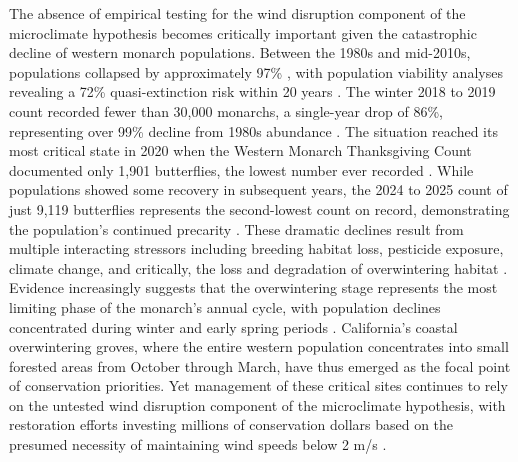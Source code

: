 The absence of empirical testing for the wind disruption component of the microclimate hypothesis becomes critically important given the catastrophic decline of western monarch populations. Between the 1980s and mid-2010s, populations collapsed by approximately 97\% \parencite{schultzCitizenScienceMonitoring2017}, with population viability analyses revealing a 72\% quasi-extinction risk within 20 years \parencite{schultzCitizenScienceMonitoring2017}. The winter 2018 to 2019 count recorded fewer than 30,000 monarchs, a single-year drop of 86\%, representing over 99\% decline from 1980s abundance \parencite{peltonWesternMonarchPopulation2019}. The situation reached its most critical state in 2020 when the Western Monarch Thanksgiving Count documented only 1,901 butterflies, the lowest number ever recorded \parencite{xercessocietyWesternMonarchThanksgiving2025}. While populations showed some recovery in subsequent years, the 2024 to 2025 count of just 9,119 butterflies represents the second-lowest count on record, demonstrating the population's continued precarity \parencite{xercessocietyWesternMonarchThanksgiving2025}. These dramatic declines result from multiple interacting stressors including breeding habitat loss, pesticide exposure, climate change, and critically, the loss and degradation of overwintering habitat \parencite{croneWhyAreMonarch2019,peltonWesternMonarchPopulation2019}. Evidence increasingly suggests that the overwintering stage represents the most limiting phase of the monarch's annual cycle, with population declines concentrated during winter and early spring periods \parencite{peltonWesternMonarchPopulation2019,mariniDensitydependenceDecliningPopulation2017}. California's coastal overwintering groves, where the entire western population concentrates into small forested areas from October through March, have thus emerged as the focal point of conservation priorities. Yet management of these critical sites continues to rely on the untested wind disruption component of the microclimate hypothesis, with restoration efforts investing millions of conservation dollars based on the presumed necessity of maintaining wind speeds below 2 m/s \parencite{althouse&meadeinc.EllwoodMesaSperling2023,themonarchpressCityAwarded392019}.

